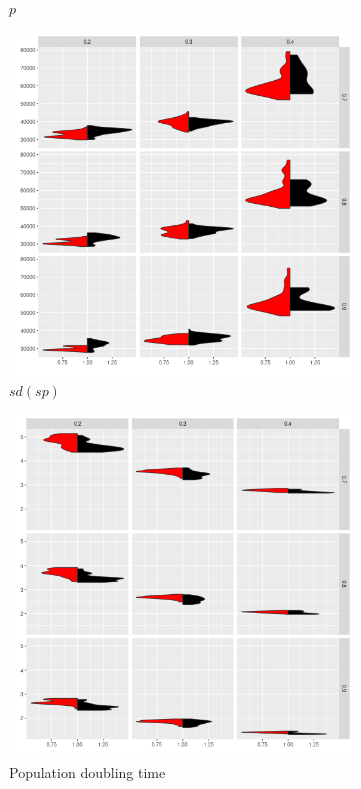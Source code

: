 \begin{figure}[!ht]
\begin{subfigure}{0.32\textwidth}
		\caption{$p$}
		\label{fig:grid-p}
	\end{subfigure}
	\begin{subfigure}{0.32\textwidth}  
		\centering 
		\includegraphics[width=\textwidth]{figures/v-sp-1.png}
		\caption{$sd(sp)$}
		\label{fig:grid-sp}
	\end{subfigure}	\begin{subfigure}{0.32\textwidth}  
		\centering 
		\includegraphics[width=\textwidth]{figures/v-d-1.png}
		\caption{Population doubling time}
		\label{fig:grid-dt}
	\end{subfigure}
	\caption{}
	\label{ref:grid}
\end{figure}

